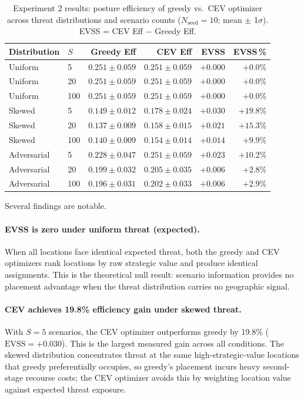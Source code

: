 \documentclass[11pt]{article}
\begin{document}
\begin{table}[htbp]
\centering
\caption{Experiment 2 results: posture efficiency of greedy vs.\ CEV
optimizer across threat distributions and scenario counts
($N_\mathrm{seed}=10$; mean $\pm$ 1$\sigma$).
EVSS = CEV Eff $-$ Greedy Eff.}
\label{tab:exp2_evss}
\begin{tabular}{llrrrr}
\toprule
Distribution & $S$ & Greedy Eff & CEV Eff & EVSS & EVSS\,\% \\
\midrule
Uniform      &   5 & $0.251 \pm 0.059$ & $0.251 \pm 0.059$ & $+0.000$ & $+0.0\%$ \\
Uniform      &  20 & $0.251 \pm 0.059$ & $0.251 \pm 0.059$ & $+0.000$ & $+0.0\%$ \\
Uniform      & 100 & $0.251 \pm 0.059$ & $0.251 \pm 0.059$ & $+0.000$ & $+0.0\%$ \\
\midrule
Skewed       &   5 & $0.149 \pm 0.012$ & $0.178 \pm 0.024$ & $+0.030$ & $+19.8\%$ \\
Skewed       &  20 & $0.137 \pm 0.009$ & $0.158 \pm 0.015$ & $+0.021$ & $+15.3\%$ \\
Skewed       & 100 & $0.140 \pm 0.009$ & $0.154 \pm 0.014$ & $+0.014$ & $+9.9\%$ \\
\midrule
Adversarial  &   5 & $0.228 \pm 0.047$ & $0.251 \pm 0.059$ & $+0.023$ & $+10.2\%$ \\
Adversarial  &  20 & $0.199 \pm 0.032$ & $0.205 \pm 0.035$ & $+0.006$ & $+2.8\%$ \\
Adversarial  & 100 & $0.196 \pm 0.031$ & $0.202 \pm 0.033$ & $+0.006$ & $+2.9\%$ \\
\bottomrule
\end{tabular}
\end{table}

Several findings are notable.

\paragraph{EVSS is zero under uniform threat (expected).}
When all locations face identical expected threat, both the greedy and
CEV optimizers rank locations by raw strategic value and produce
identical assignments.  This is the theoretical null result: scenario
information provides no placement advantage when the threat distribution
carries no geographic signal.

\paragraph{CEV achieves 19.8\% efficiency gain under skewed threat.}
With $S = 5$ scenarios, the CEV optimizer outperforms greedy by 19.8\%
($\mathrm{EVSS} = +0.030$).  This is the largest measured gain across
all conditions.  The skewed distribution concentrates threat at the
same high-strategic-value locations that greedy preferentially occupies,
so greedy's placement incurs heavy second-stage recourse costs; the CEV
optimizer avoids this by weighting location value against expected threat
exposure.
\end{document}
